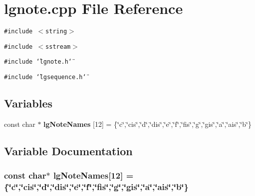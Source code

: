 \section{lgnote.cpp File Reference}
\label{lgnote_8cpp}
{\tt \#include $<$string$>$}\par
{\tt \#include $<$sstream$>$}\par
{\tt \#include \char`\"{}lgnote.h\char`\"{}}\par
{\tt \#include \char`\"{}lgsequence.h\char`\"{}}\par
\subsection*{Variables}
\begin{CompactItemize}
\item 
const char $\ast$ {\bf lg\-Note\-Names} [12] = \{\char`\"{}c\char`\"{},\char`\"{}cis\char`\"{},\char`\"{}d\char`\"{},\char`\"{}dis\char`\"{},\char`\"{}e\char`\"{},\char`\"{}f\char`\"{},\char`\"{}fis\char`\"{},\char`\"{}g\char`\"{},\char`\"{}gis\char`\"{},\char`\"{}a\char`\"{},\char`\"{}ais\char`\"{},\char`\"{}b\char`\"{}\}
\end{CompactItemize}


\subsection{Variable Documentation}
\subsubsection{\setlength{\rightskip}{0pt plus 5cm}const char$\ast$ {\bf lg\-Note\-Names}[12] = \{\char`\"{}c\char`\"{},\char`\"{}cis\char`\"{},\char`\"{}d\char`\"{},\char`\"{}dis\char`\"{},\char`\"{}e\char`\"{},\char`\"{}f\char`\"{},\char`\"{}fis\char`\"{},\char`\"{}g\char`\"{},\char`\"{}gis\char`\"{},\char`\"{}a\char`\"{},\char`\"{}ais\char`\"{},\char`\"{}b\char`\"{}\}}\label{lgnote_8cpp_a0}


